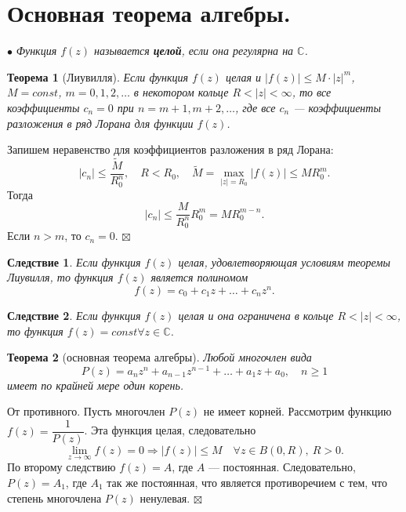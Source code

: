 \documentclass[a4paper, 12pt]{article}
\newenvironment{Proof} %
{\par\noindent{$\blacklozenge$}} %
{\hfill$\scriptstyle\boxtimes$}
\newcommand{\Cm}{\mathbb{C}}
\renewcommand{\leq}{\leqslant}
\renewcommand{\geq}{\geqslant}
\newtheorem*{theorem}{Теорема}
\newtheorem*{cor}{Следствие}
\begin{document}
\section{Основная теорема алгебры.}
$\bullet$ \textit{Функция $f(z)$ называется \textbf{целой}, если она регулярна на $\mathbb{C}$.}
\begin{theorem}
	[Лиувилля] Если функция $f(z)$ целая и $|f(z)| \leq M\cdot |z|^m$, $M = const$, $m = 0,1,2,\ldots$ в некотором кольце $R < |z| < \infty$, то все коэффициенты $c_n = 0$ при $n = m+1, m+2, \ldots$, где все $c_n$ --- коэффициенты разложения в ряд Лорана для функции $f(z)$.
\end{theorem}\begin{Proof}
Запишем неравенство для коэффициентов разложения в ряд Лорана:
$$|c_n|\leq \dfrac{\widetilde{M}}{R_0^n},\quad R< R_0,\quad \widetilde{M} = \underset{|z| = R_0}{\max}|f(z)| \leq MR_0^m.$$
Тогда $$|c_n| \leq \dfrac{M}{R_0^n}R_0^m = MR_0^{m-n}.$$
Если $n > m$, то $c_n = 0$.
\end{Proof}
\begin{cor}
	Если функция $f(z)$ целая, удовлетворяющая условиям теоремы Лиувилля, то функция $f(z)$ является полиномом
	$$f(z) = c_0 + c_1z + \ldots + c_nz^n.$$
\end{cor}
\begin{cor}
	Если функция $f(z)$ целая и она ограничена в кольце $R < |z| < \infty$, то функция $f(z) = const \forall z \in \Cm$.
\end{cor}
\begin{theorem}
	[основная теорема алгебры]
	Любой многочлен вида $$P(z) = a_nz^n + a_{n-1}z^{n-1} + \ldots + a_1z + a_0,\quad n \geq 1$$ имеет по крайней мере один корень.
\end{theorem}
\begin{Proof}
	От противного. Пусть многочлен $P(z)$ не имеет корней. Рассмотрим функцию $f(z) = \dfrac{1}{P(z)}$. Эта функция целая, следовательно $$\lim\limits_{z\to \infty}f(z) = 0\Rightarrow |f(z)|\leq M\quad \forall z \in B(0,R),\ R>0.$$
	По второму следствию $f(z) = A$, где $A$ --- постоянная. Следовательно, $P(z) = A_1$, где $A_1$ так же постоянная, что является противоречием с тем, что степень многочлена $P(z)$ ненулевая.
\end{Proof}
\end{document}
